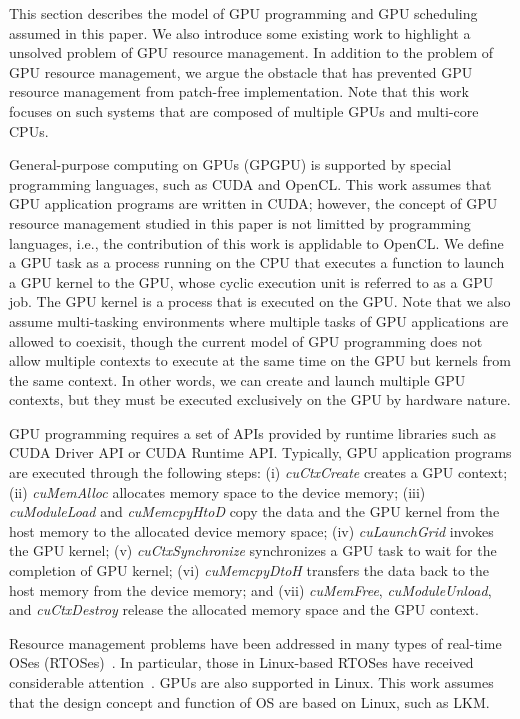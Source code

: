 \label{sec:system_model}
This section describes the model of GPU programming and GPU scheduling
assumed in this paper.
We also introduce some existing work to highlight a unsolved problem of
GPU resource management.
In addition to the problem of GPU resource management, we argue the
obstacle that has prevented GPU resource management from patch-free
implementation. 
Note that this work focuses on such systems that are composed of
multiple GPUs and multi-core CPUs.

General-purpose computing on GPUs (GPGPU) is supported by special
programming languages, such as CUDA and OpenCL.
This work assumes that GPU application programs are written in CUDA;
however, the concept of GPU resource management studied in this paper is
not limitted by programming languages, i.e., the contribution of this
work is applidable to OpenCL.
We define a GPU task as a process running on the CPU that executes a
function to launch a GPU kernel to the GPU, whose cyclic execution unit
is referred to as a GPU job.
The GPU kernel is a process that is executed on the GPU. 
Note that we also assume multi-tasking environments where multiple tasks
of GPU applications are allowed to coexisit, though the current model of
GPU programming does not allow multiple contexts to execute at the same
time on the GPU but kernels from the same context.
In other words, we can create and launch multiple GPU contexts, but they
must be executed exclusively on the GPU by hardware nature.

GPU programming requires a set of APIs provided by runtime libraries
such as CUDA Driver API or CUDA Runtime API.
Typically, GPU application programs are executed through the following
steps:
(i) \textit{cuCtxCreate} creates a GPU context;
(ii) \textit{cuMemAlloc} allocates memory space to the device memory; 
(iii) \textit{cuModuleLoad} and \textit{cuMemcpyHtoD} copy the data and
the GPU kernel from the host memory to the allocated device memory
space;
(iv) \textit{cuLaunchGrid} invokes the GPU kernel;
(v) \textit{cuCtxSynchronize} synchronizes a GPU task to wait for the
completion of GPU kernel;
(vi) \textit{cuMemcpyDtoH} transfers the data back to the host memory
from the device memory; and
(vii) \textit{cuMemFree}, \textit{cuModuleUnload}, and \textit{cuCtxDestroy} release the allocated memory space and the GPU context.

Resource management problems have been addressed in many types of
real-time OSes (RTOSes)~\cite{spring,redline,itron,rk}.
In particular, those in Linux-based RTOSes have received considerable
attention~\cite{litmus,prk,rtai,yodaiken1999rtlinux,kato2009loadable}.
GPUs are also supported in Linux.
This work assumes that the design concept and function of OS are based
on Linux, such as LKM.

